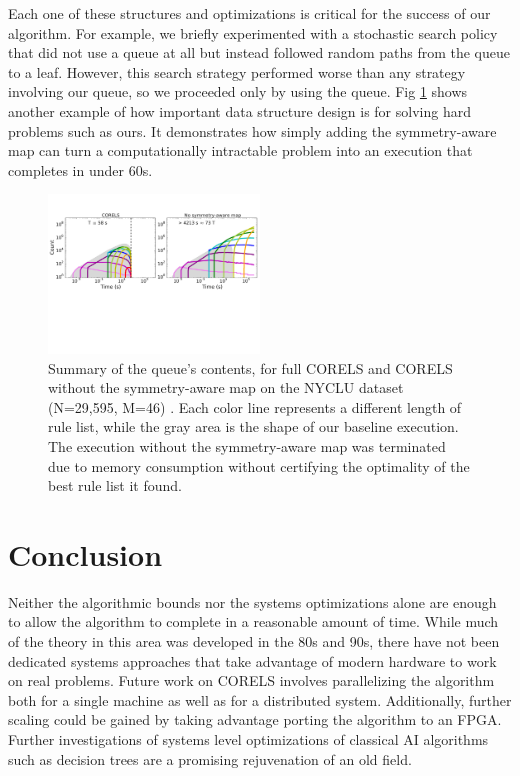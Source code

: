 \documentclass[format=sigconf]{acmart}
\begin{document}
Each one of these structures and optimizations is critical for the success of our algorithm.
For example, we briefly experimented with a stochastic search policy that did not use a queue at all but instead followed random paths from the queue to a leaf.
However, this search strategy performed worse than any strategy involving our queue, so we proceeded only by using the queue.
Fig \ref{fig:ablation} shows another example of how important data structure design is for solving hard problems such as ours.
It demonstrates how simply adding the symmetry-aware map can turn a computationally intractable problem into an execution that completes in under 60s.

\begin{figure}[t!]
\begin{center}
\includegraphics[trim={0mm 0mm 0mm 1mm}, width=0.5\textwidth]{figs/sysml_ablation-queue.pdf}
\end{center}
\vspace{-5mm}
\caption{Summary of the queue's contents, for full CORELS and CORELS without the symmetry-aware map on the NYCLU dataset (N=29,595, M=46)  \citep{nyclu:2014}.
Each color line represents a different length of rule list, while the gray area is the shape of our baseline execution.
The execution without the symmetry-aware map was terminated due to memory consumption without certifying the optimality of the best rule list it found.
}
\label{fig:ablation}
\end{figure}

\section{Conclusion}
Neither the algorithmic bounds nor the systems optimizations alone are enough to allow the algorithm to complete in a reasonable amount of time.
While much of the theory in this area was developed in the 80s and 90s, there have not been dedicated systems approaches that take advantage of modern hardware to work on real problems.
Future work on CORELS involves parallelizing the algorithm both for a single machine as well as for a distributed system.
Additionally, further scaling could be gained by taking advantage porting the algorithm to an FPGA.
Further investigations of systems level optimizations of classical AI algorithms such as decision trees are a promising rejuvenation of an old field.



\end{document}
